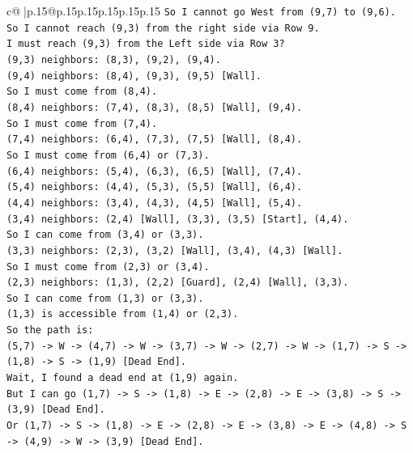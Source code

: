 \documentclass{article}
\begin{document}
{\begin{supertabular}{c@{$\;$}|p{.15\linewidth}@{}p{.15\linewidth}p{.15\linewidth}p{.15\linewidth}p{.15\linewidth}p{.15\linewidth}}
{{{\texttt{So I cannot go West from (9,7) to (9,6).} \\
\texttt{So I cannot reach (9,3) from the right side via Row 9.} \\
\texttt{I must reach (9,3) from the Left side via Row 3?} \\
\texttt{(9,3) neighbors: (8,3), (9,2), (9,4).} \\
\texttt{(9,4) neighbors: (8,4), (9,3), (9,5) {[}Wall{]}.} \\
\texttt{So I must come from (8,4).} \\
\texttt{(8,4) neighbors: (7,4), (8,3), (8,5) {[}Wall{]}, (9,4).} \\
\texttt{So I must come from (7,4).} \\
\texttt{(7,4) neighbors: (6,4), (7,3), (7,5) {[}Wall{]}, (8,4).} \\
\texttt{So I must come from (6,4) or (7,3).} \\
\texttt{(6,4) neighbors: (5,4), (6,3), (6,5) {[}Wall{]}, (7,4).} \\
\texttt{(5,4) neighbors: (4,4), (5,3), (5,5) {[}Wall{]}, (6,4).} \\
\texttt{(4,4) neighbors: (3,4), (4,3), (4,5) {[}Wall{]}, (5,4).} \\
\texttt{(3,4) neighbors: (2,4) {[}Wall{]}, (3,3), (3,5) {[}Start{]}, (4,4).} \\
\texttt{So I can come from (3,4) or (3,3).} \\
\texttt{(3,3) neighbors: (2,3), (3,2) {[}Wall{]}, (3,4), (4,3) {[}Wall{]}.} \\
\texttt{So I must come from (2,3) or (3,4).} \\
\texttt{(2,3) neighbors: (1,3), (2,2) {[}Guard{]}, (2,4) {[}Wall{]}, (3,3).} \\
\texttt{So I can come from (1,3) or (3,3).} \\
\texttt{(1,3) is accessible from (1,4) or (2,3).} \\
\texttt{So the path is:} \\
\texttt{(5,7) {-}> W {-}> (4,7) {-}> W {-}> (3,7) {-}> W {-}> (2,7) {-}> W {-}> (1,7) {-}> S {-}> (1,8) {-}> S {-}> (1,9) {[}Dead End{]}.} \\
\texttt{Wait, I found a dead end at (1,9) again.} \\
\texttt{But I can go (1,7) {-}> S {-}> (1,8) {-}> E {-}> (2,8) {-}> E {-}> (3,8) {-}> S {-}> (3,9) {[}Dead End{]}.} \\
\texttt{Or (1,7) {-}> S {-}> (1,8) {-}> E {-}> (2,8) {-}> E {-}> (3,8) {-}> E {-}> (4,8) {-}> S {-}> (4,9) {-}> W {-}> (3,9) {[}Dead End{]}.} \\
}}}
\end{supertabular}}
\end{document}
